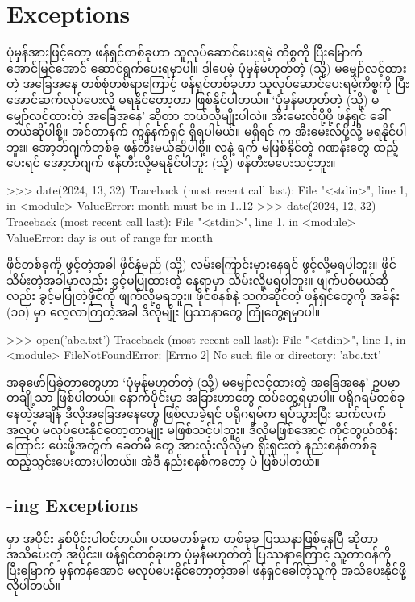 \section{Exceptions}
ပုံမှန်အားဖြင့်တော့ ဖန်ရှင်တစ်ခုဟာ သူလုပ်ဆောင်ပေးရမဲ့ ကိစ္စကို ပြီးမြောက် အောင်မြင်အောင် ဆောင်\allowbreak ရွက်ပေးရမှာပါ။ ဒါပေမဲ့ ပုံမှန်မဟုတ်တဲ့ (သို့) မမျှော်လင့်ထားတဲ့ အခြေအနေ တစ်စုံတစ်ရာကြောင့် ဖန်ရှင်တစ်ခုဟာ သူလုပ်ဆောင်ပေးရမဲ့ကိစ္စကို ပြီးအောင်ဆက်လုပ်ပေးလို့ မရနိုင်တော့တာ ဖြစ်နိုင်ပါတယ်။ ‘ပုံမှန်မဟုတ်တဲ့ (သို့) မမျှော်လင့်ထားတဲ့ အခြေအနေ’ ဆိုတာ ဘယ်လိုမျိုးပါလဲ။ အီးမေးလ်ပို့ဖို့  ဖန်ရှင် ခေါ်တယ်ဆိုပါစို့။ အင်တာနက် ကွန်နက်ရှင် ရှိရပါမယ်။ မရှိရင်  က အီးမေးလ်ပို့လို့ မရနိုင်ပါဘူး။  အော့ဘ်ဂျက်တစ်ခု ဖန်တီးမယ်ဆိုပါစို့။ လနဲ့ ရက် မဖြစ်နိုင်တဲ့ ဂဏန်းတွေ ထည့်ပေးရင် အော့ဘ်ဂျက် ဖန်တီးလို့မရနိုင်ပါဘူး (သို့) ဖန်တီးမပေးသင့်ဘူး။
\begin{codetxt}
>>> date(2024, 13, 32)
Traceback (most recent call last):
  File "<stdin>", line 1, in <module>
ValueError: month must be in 1..12
>>> date(2024, 12, 32)
Traceback (most recent call last):
  File "<stdin>", line 1, in <module>
ValueError: day is out of range for month
\end{codetxt}
ဖိုင်တစ်ခုကို ဖွင့်တဲ့အခါ ဖိုင်နံမည် (သို့)  လမ်းကြောင်းမှားနေရင် ဖွင့်လို့မရပါဘူး။ ဖိုင်သိမ်းတဲ့အခါမှာလည်း ခွင့်မပြုထားတဲ့ နေရာမှာ သိမ်းလို့မရပါဘူး။ ဖျက်ပစ်မယ်ဆိုလည်း ခွင့်မပြုတဲ့ဖိုင်ကို ဖျက်လို့မရဘူး။ ဖိုင်စနစ်နဲ့ သက်ဆိုင်တဲ့ ဖန်ရှင်တွေကို အခန်း (၁၀) မှာ လေ့လာကြတဲ့အခါ ဒီလိုမျိုး ပြဿနာတွေ ကြုံတွေ့ရမှာပါ။  
\begin{codetxt}
>>> open('abc.txt')
Traceback (most recent call last):
  File "<stdin>", line 1, in <module>
FileNotFoundError: [Errno 2] No such file or directory: 'abc.txt'
\end{codetxt}

အခုဖော်ပြခဲ့တာတွေဟာ ‘ပုံမှန်မဟုတ်တဲ့ (သို့) မမျှော်လင့်ထားတဲ့ အခြေအနေ’ ဥပမာတချို့သာ ဖြစ်ပါတယ်။ နောက်ပိုင်းမှာ အခြားဟာတွေ ထပ်တွေ့ရမှာပါ။ ပရိုဂရမ်တစ်ခု  နေတဲ့အချိန် ဒီလိုအခြေအနေတွေ ဖြစ်လာခဲ့ရင် ပရိုဂရမ်က ရပ်သွားပြီး ဆက်လက် အလုပ် မလုပ်ပေးနိုင်တော့တာမျိုး မဖြစ်သင့်ပါဘူး။ ဒီလိုမဖြစ်အောင် ကိုင်တွယ်ထိန်းကြောင်း ပေးဖို့အတွက် ခေတ်မီ  တွေ အားလုံးလိုလိုမှာ ရိုးရှင်းတဲ့ နည်းစနစ်တစ်ခု ထည့်သွင်းပေးထားပါတယ်။ အဲဒီ နည်းစနစ်ကတော့  ပဲ ဖြစ်ပါတယ်။

\subsection*{ -ing Exceptions}
 မှာ အပိုင်း နှစ်ပိုင်းပါဝင်တယ်။ ပထမတစ်ခုက တစ်ခုခု ပြဿနာဖြစ်နေပြီ ဆိုတာ အသိပေးတဲ့ အပိုင်း။ ဖန်ရှင်တစ်ခုဟာ ပုံမှန်မဟုတ်တဲ့ ပြဿနာကြောင့် သူ့တာဝန်ကို ပြီးမြောက် မှန်ကန်အောင် မလုပ်ပေးနိုင်တော့တဲ့အခါ ဖန်ရှင်ခေါ်တဲ့သူကို အသိပေးနိုင်ဖို့ လိုပါတယ်။

